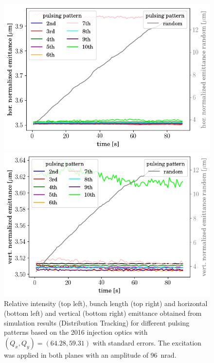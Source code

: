 \documentclass[%
 reprint,
 amsmath,amssymb,
 aps,
prstab,
]{revtex4-1}
\begin{document}
\begin{figure}[b]
\begin{minipage}[t]{0.49\linewidth}
		\includegraphics[width=1.0\linewidth]{2016injerra2b2u_pattern_3_5um_emit1.png}
	\end{minipage}
	\begin{minipage}[t]{0.49\linewidth}
		\centering
		\includegraphics[width=1.0\linewidth]{2016injerra2b2u_pattern_3_5um_emit2.png}
	\end{minipage}	
	\caption{\label{fig:patternsim} Relative intensity (top left), bunch length (top right) and horizontal (bottom left) and vertical (bottom right) emittance obtained from simulation results (Distribution Tracking) for different pulsing patterns based on the 2016 injection optics with $(Q_x,Q_y)=(64.28,59.31)$ with standard errors. The excitation was applied in both planes with an amplitude of 96~nrad.}
\end{figure}
\end{document}
